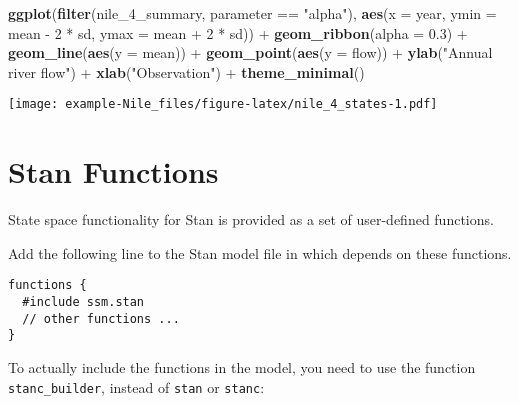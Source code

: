 \documentclass[]{book}
\newenvironment{Shaded}{\begin{snugshade}}{\end{snugshade}}
\newcommand{\KeywordTok}[1]{\textcolor[rgb]{0.13,0.29,0.53}{\textbf{{#1}}}}
\newcommand{\DataTypeTok}[1]{\textcolor[rgb]{0.13,0.29,0.53}{{#1}}}
\newcommand{\DecValTok}[1]{\textcolor[rgb]{0.00,0.00,0.81}{{#1}}}
\newcommand{\FloatTok}[1]{\textcolor[rgb]{0.00,0.00,0.81}{{#1}}}
\newcommand{\StringTok}[1]{\textcolor[rgb]{0.31,0.60,0.02}{{#1}}}
\newcommand{\NormalTok}[1]{{#1}}
\begin{document}
\begin{Shaded}
\begin{Highlighting}[]
\KeywordTok{ggplot}\NormalTok{(}\KeywordTok{filter}\NormalTok{(nile_4_summary, parameter ==}\StringTok{ "alpha"}\NormalTok{),}
       \KeywordTok{aes}\NormalTok{(}\DataTypeTok{x =} \NormalTok{year,}
           \DataTypeTok{ymin =} \NormalTok{mean -}\StringTok{ }\DecValTok{2} \NormalTok{*}\StringTok{ }\NormalTok{sd,}
           \DataTypeTok{ymax =} \NormalTok{mean +}\StringTok{ }\DecValTok{2} \NormalTok{*}\StringTok{ }\NormalTok{sd)) +}
\StringTok{  }\KeywordTok{geom_ribbon}\NormalTok{(}\DataTypeTok{alpha =} \FloatTok{0.3}\NormalTok{) +}
\StringTok{  }\KeywordTok{geom_line}\NormalTok{(}\KeywordTok{aes}\NormalTok{(}\DataTypeTok{y =} \NormalTok{mean)) +}
\StringTok{  }\KeywordTok{geom_point}\NormalTok{(}\KeywordTok{aes}\NormalTok{(}\DataTypeTok{y =} \NormalTok{flow)) +}
\StringTok{  }\KeywordTok{ylab}\NormalTok{(}\StringTok{"Annual river flow"}\NormalTok{) +}
\StringTok{  }\KeywordTok{xlab}\NormalTok{(}\StringTok{"Observation"}\NormalTok{) +}
\StringTok{  }\KeywordTok{theme_minimal}\NormalTok{()}
\end{Highlighting}
\end{Shaded}

\texttt{[image: example-Nile\_files/figure-latex/nile\_4\_states-1.pdf]}

\chapter{Stan Functions}\label{stan-functions}

State space functionality for Stan is provided as a set of user-defined
functions.

Add the following line to the Stan model file in which depends on these
functions.

\begin{verbatim}
functions {
  #include ssm.stan
  // other functions ...
}
\end{verbatim}

To actually include the functions in the model, you need to use the
function \texttt{stanc\_builder}, instead of \texttt{stan} or
\texttt{stanc}:

\begin{Shaded}
\end{Shaded}
\end{document}
